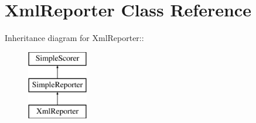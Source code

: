 \hypertarget{class_xml_reporter}{
\section{XmlReporter Class Reference}
\label{class_xml_reporter}
}
Inheritance diagram for XmlReporter::\begin{figure}[H]
\begin{center}
\leavevmode
\includegraphics[height=3cm]{class_xml_reporter}
\end{center}
\end{figure}

